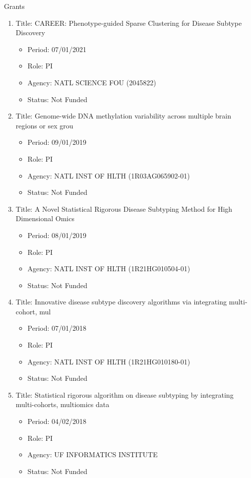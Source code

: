 \documentclass{resume} %
\begin{document}
\begin{rSection}{Grants}
\begin{enumerate}[noitemsep,topsep=0pt]
\item Title: CAREER: Phenotype-guided Sparse Clustering for Disease Subtype Discovery
\begin{itemize}[noitemsep,topsep=0pt,leftmargin=*]
\item[] Period: 07/01/2021
\item[] Role: PI
\item[] Agency: NATL SCIENCE FOU (2045822)
\item[] Status:  Not Funded
\end{itemize}

\item Title: Genome-wide DNA methylation variability across multiple brain regions or sex grou
\begin{itemize}[noitemsep,topsep=0pt,leftmargin=*]
\item[] Period: 09/01/2019
\item[] Role: PI
\item[] Agency: NATL INST OF HLTH (1R03AG065902-01)
\item[] Status:  Not Funded
\end{itemize}

\item Title: A Novel Statistical Rigorous Disease Subtyping Method for High Dimensional Omics
\begin{itemize}[noitemsep,topsep=0pt,leftmargin=*]
\item[] Period: 08/01/2019
\item[] Role: PI
\item[] Agency: NATL INST OF HLTH (1R21HG010504-01)
\item[] Status:  Not Funded
\end{itemize}

\item Title: Innovative disease subtype discovery algorithms via integrating multi-cohort, mul
\begin{itemize}[noitemsep,topsep=0pt,leftmargin=*]
\item[] Period: 07/01/2018
\item[] Role: PI
\item[] Agency: NATL INST OF HLTH (1R21HG010180-01)
\item[] Status:  Not Funded
\end{itemize}

\item Title: Statistical rigorous algorithm on disease subtyping by integrating multi-cohorts, multiomics data
\begin{itemize}[noitemsep,topsep=0pt,leftmargin=*]
\item[] Period: 04/02/2018
\item[] Role: PI
\item[] Agency: UF INFORMATICS INSTITUTE
\item[] Status:  Not Funded
\end{itemize}


\end{enumerate}
\end{rSection}
\end{document}
